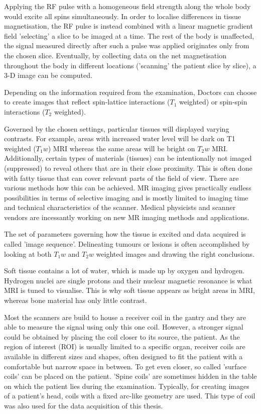 Applying the RF pulse with a homogeneous field strength along the whole body would excite all spins simultaneously.
In order to localise differences in tissue magnetisation, the RF pulse is instead combined with a linear magnetic gradient field 'selecting' a slice to be imaged at a time.
The rest of the body is unaffected, the signal measured directly after such a pulse was applied originates only from the chosen slice.
Eventually, by collecting data on the net magnetisation throughout the body in different locations ('scanning' the patient slice by slice), a 3-D image can be computed.

Depending on the information required from the examination, Doctors can choose to create images that reflect spin-lattice interactions ($T_1$ weighted) or spin-spin interactions ($T_2$ weighted).

Governed by the chosen settings, particular tissues will displayed varying contrasts.
For example, areas with increased water level will be dark on T1 weighted ($T_1w$) MRI whereas the same areas will be bright on $T_2w$ MRI.
Additionally, certain types of materials (tissues) can be intentionally not imaged (suppressed) to reveal others that are in their close proximity.
This is often done with fatty tissue that can cover relevant parts of the field of view.
There are various methods how this can be achieved.
MR imaging gives practically endless possibilities in terms of selective imaging and is mostly limited to imaging time and technical characteristics of the scanner.
Medical physicists and scanner vendors are incessantly working on new MR imaging methods and applications. 

The set of parameters governing how the tissue is excited and data acquired is called 'image sequence'.
Delineating tumours or lesions is often accomplished by looking at both $T_1w$ and $T_2w$ weighted images and drawing the right conclusions.

Soft tissue contains a lot of water, which is made up by oxygen and hydrogen.
Hydrogen nuclei are single protons and their nuclear magnetic resonance is what MRI is tuned to visualise.
This is why soft tissue appears as bright areas in MRI, whereas bone material has only little contrast. \cite{Currie2013}


Most the scanners are build to house a receiver coil in the gantry and they are able to measure the signal using only this one coil.
However, a stronger signal could be obtained by placing the coil closer to its source, the patient.
As the region of interest (ROI) is usually limited to a specific organ, receiver coils are available in different sizes and shapes, often designed to fit the patient with a comfortable but narrow space in between.
To get even closer, so called 'surface coils' can be placed on the patient.
'Spine coils' are sometimes hidden in the table on which the patient lies during the examination.
Typically, for creating images of a patient's head, coils with a fixed arc-like geometry are used.
This type of coil was also used for the data acquisition of this thesis.

